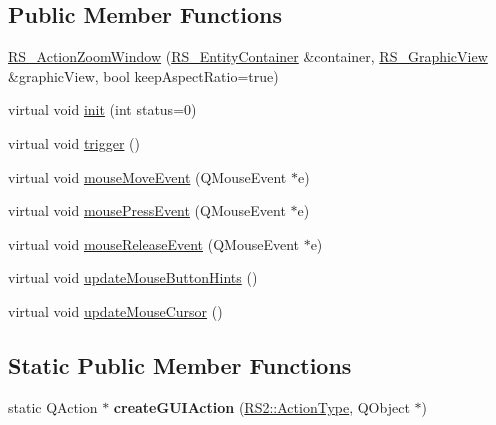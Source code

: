 \subsection*{Public Member Functions}
\begin{DoxyCompactItemize}
\item 
\hyperlink{classRS__ActionZoomWindow_ae218fddffe1948ea1b7e3b80d08f4b3c}{R\-S\-\_\-\-Action\-Zoom\-Window} (\hyperlink{classRS__EntityContainer}{R\-S\-\_\-\-Entity\-Container} \&container, \hyperlink{classRS__GraphicView}{R\-S\-\_\-\-Graphic\-View} \&graphic\-View, bool keep\-Aspect\-Ratio=true)
\item 
virtual void \hyperlink{classRS__ActionZoomWindow_a40588ecd6c755410a2d18482ccd3a414}{init} (int status=0)
\item 
virtual void \hyperlink{classRS__ActionZoomWindow_a8446256ec3f0d39a93018e34824ed5cf}{trigger} ()
\item 
virtual void \hyperlink{classRS__ActionZoomWindow_a5d66169a336e4e66ca2f5603d74bf879}{mouse\-Move\-Event} (Q\-Mouse\-Event $\ast$e)
\item 
virtual void \hyperlink{classRS__ActionZoomWindow_a2eddecda9f2e9b8e0decd018096ff4df}{mouse\-Press\-Event} (Q\-Mouse\-Event $\ast$e)
\item 
virtual void \hyperlink{classRS__ActionZoomWindow_a5465b575d101df87274def7c71cf2e8f}{mouse\-Release\-Event} (Q\-Mouse\-Event $\ast$e)
\item 
virtual void \hyperlink{classRS__ActionZoomWindow_a93c839446fb489ba3c80ca518eb42a28}{update\-Mouse\-Button\-Hints} ()
\item 
virtual void \hyperlink{classRS__ActionZoomWindow_af800f6756436dff7b0632f57bc48d366}{update\-Mouse\-Cursor} ()
\end{DoxyCompactItemize}
\subsection*{Static Public Member Functions}
\begin{DoxyCompactItemize}
\item 
\hypertarget{classRS__ActionZoomWindow_a9bb63f5262bc145ff7114d693d5d9c6b}{static Q\-Action $\ast$ {\bfseries create\-G\-U\-I\-Action} (\hyperlink{classRS2_afe3523e0bc41fd637b892321cfc4b9d7}{R\-S2\-::\-Action\-Type}, Q\-Object $\ast$)}\label{classRS__ActionZoomWindow_a9bb63f5262bc145ff7114d693d5d9c6b}

\end{DoxyCompactItemize}
